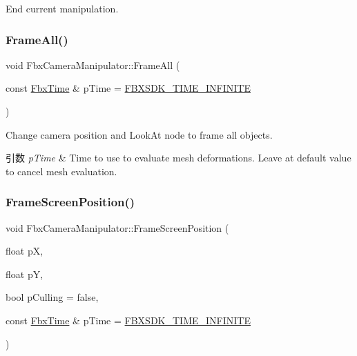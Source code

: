 End current manipulation. 

\mbox{\label{class_fbx_camera_manipulator_a78fab2478759b295c01ab4a4e5f716e9}} 
\subsubsection{\texorpdfstring{Frame\+All()}{FrameAll()}}
{\footnotesize\ttfamily void Fbx\+Camera\+Manipulator\+::\+Frame\+All (\begin{DoxyParamCaption}\item[{const \hyperlink{class_fbx_time}{Fbx\+Time} \&}]{p\+Time = {\ttfamily \hyperlink{fbxtime_8h_a1e6db3fe0f84f0b7daa775739f93526f}{F\+B\+X\+S\+D\+K\+\_\+\+T\+I\+M\+E\+\_\+\+I\+N\+F\+I\+N\+I\+TE}} }\end{DoxyParamCaption})}

Change camera position and Look\+At node to frame all objects. 
\begin{DoxyParams}{引数}
{\em p\+Time} & Time to use to evaluate mesh deformations. Leave at default value to cancel mesh evaluation. \\
\hline
\end{DoxyParams}
\mbox{\label{class_fbx_camera_manipulator_a622a6f144dede94c05ed63c80832f25f}} 
\subsubsection{\texorpdfstring{Frame\+Screen\+Position()}{FrameScreenPosition()}}
{\footnotesize\ttfamily void Fbx\+Camera\+Manipulator\+::\+Frame\+Screen\+Position (\begin{DoxyParamCaption}\item[{float}]{pX,  }\item[{float}]{pY,  }\item[{bool}]{p\+Culling = {\ttfamily false},  }\item[{const \hyperlink{class_fbx_time}{Fbx\+Time} \&}]{p\+Time = {\ttfamily \hyperlink{fbxtime_8h_a1e6db3fe0f84f0b7daa775739f93526f}{F\+B\+X\+S\+D\+K\+\_\+\+T\+I\+M\+E\+\_\+\+I\+N\+F\+I\+N\+I\+TE}} }\end{DoxyParamCaption})}

